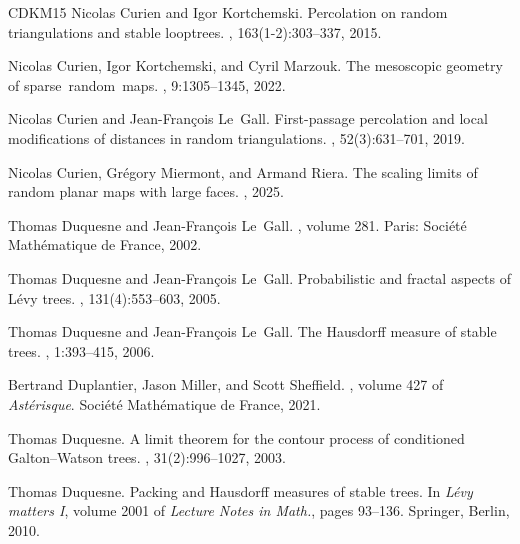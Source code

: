 \documentclass[british, a4paper,11pt]{article}
\numberwithin{equation}{section}
\theoremstyle{definition}
\begin{document}
{\begin{thebibliography}{CDKM15}
Nicolas Curien and Igor Kortchemski.
\newblock Percolation on random triangulations and stable looptrees.
, 163(1-2):303--337, 2015.

Nicolas Curien, Igor Kortchemski, and Cyril Marzouk.
\newblock The mesoscopic geometry of sparse~random~maps.
, 9:1305--1345, 2022.

Nicolas Curien and Jean-Fran{\c{c}}ois Le~Gall.
\newblock First-passage percolation and local modifications of distances in
  random triangulations.
, 52(3):631--701, 2019.

Nicolas Curien, Gr\'egory Miermont, and Armand Riera.
\newblock The scaling limits of random planar maps with large faces.
, 2025.

Thomas Duquesne and Jean-Fran\c{c}ois Le~Gall.
, volume 281.
\newblock Paris: Soci\'et\'e Math\'ematique de France, 2002.

Thomas Duquesne and Jean-Fran{\c{c}}ois Le~Gall.
\newblock Probabilistic and fractal aspects of {L}\'evy trees.
, 131(4):553--603, 2005.

Thomas Duquesne and Jean-Fran{\c{c}}ois Le~Gall.
\newblock The {H}ausdorff measure of stable trees.
, 1:393--415, 2006.

Bertrand Duplantier, Jason Miller, and Scott Sheffield.
, volume 427 of
  {\em Ast{\'e}risque}.
\newblock Soci{\'e}t{\'e} Math{\'e}matique de France, 2021.

Thomas Duquesne.
\newblock A limit theorem for the contour process of conditioned
  {Galton--Watson} trees.
, 31(2):996--1027, 2003.

Thomas Duquesne.
\newblock Packing and {H}ausdorff measures of stable trees.
\newblock In {\em L\'evy matters {I}}, volume 2001 of {\em Lecture Notes in
  Math.}, pages 93--136. Springer, Berlin, 2010.


\end{thebibliography}}
\end{document}
